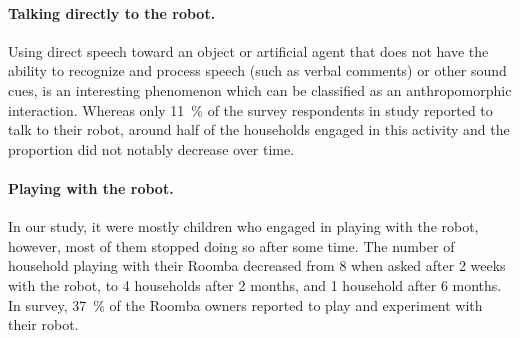 \documentclass{frontiersSCNS} %
\begin{document}
\paragraph*{Talking directly to the robot.} Using direct speech toward an object
or artificial agent that does not have the ability to recognize and process
speech (such as verbal comments) or other sound cues, is an interesting
phenomenon which can be classified as an anthropomorphic interaction. Whereas
only 11~\% of the survey respondents in \cite{sung_housewives_2008} study
reported to talk to their robot, around half of the households engaged in this
activity and the proportion did not notably decrease over time. 

\paragraph*{Playing with the robot.} In our study, it were mostly children who
engaged in playing with the robot, however, most of them stopped doing so after
some time. The number of household playing with their Roomba decreased from 8
when asked after 2 weeks with the robot, to 4 households after 2 months, and 1
household after 6 months. In \cite{sung_housewives_2008} survey, 37~\% of the
Roomba owners reported to play and experiment with their robot.\\ 

\end{document}
